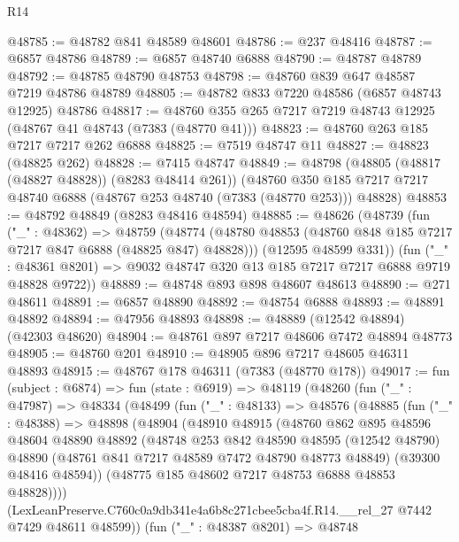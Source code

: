 \begin{lexlean}{R14}
\begin{coremodule}
@48785 := @48782 @841 @48589 @48601
@48786 := @237 @48416
@48787 := @6857 @48786
@48789 := @6857 @48740 @6888
@48790 := @48787 @48789
@48792 := @48785 @48790 @48753
@48798 := @48760 @839 @647 @48587 @7219 @48786 @48789
@48805 := @48782 @833 @7220 @48586 (@6857 @48743 @12925) @48786
@48817 := @48760 @355 @265 @7217 @7219 @48743 @12925 (@48767 @41 @48743 (@7383 (@48770 @41)))
@48823 := @48760 @263 @185 @7217 @7217 @262 @6888
@48825 := @7519 @48747 @11
@48827 := @48823 (@48825 @262)
@48828 := @7415 @48747
@48849 := @48798
    (@48805 (@48817 (@48827 @48828)) (@8283 @48414 @261))
    (@48760 @350 @185 @7217 @7217 @48740 @6888 (@48767 @253 @48740 (@7383 (@48770 @253))) @48828)
@48853 := @48792 @48849 (@8283 @48416 @48594)
@48885 := @48626
    (@48739
      (fun ("_" : @48362) =>
      @48759
        (@48774 (@48780 @48853 (@48760 @848 @185 @7217 @7217 @847 @6888 (@48825 @847) @48828)))
        (@12595 @48599 @331))
      (fun ("_" : @48361 @8201) => @9032 @48747 @320 @13 @185 @7217 @7217 @6888 @9719 @48828 @9722))
@48889 := @48748 @893 @898 @48607 @48613
@48890 := @271 @48611
@48891 := @6857 @48890
@48892 := @48754 @6888
@48893 := @48891 @48892
@48894 := @47956 @48893
@48898 := @48889 (@12542 @48894) (@42303 @48620)
@48904 := @48761 @897 @7217 @48606 @7472 @48894 @48773
@48905 := @48760 @201
@48910 := @48905 @896 @7217 @48605 @46311 @48893
@48915 := @48767 @178 @46311 (@7383 (@48770 @178))
@49017 := fun (subject : @6874) =>
  fun (state : @6919) =>
  @48119
    (@48260
      (fun ("_" : @47987) =>
      @48334
        (@48499
          (fun ("_" : @48133) =>
          @48576
            (@48885
              (fun ("_" : @48388) =>
              @48898
                (@48904
                  (@48910
                    @48915
                    (@48760
                      @862
                      @895
                      @48596
                      @48604
                      @48890
                      @48892
                      (@48748
                        @253
                        @842
                        @48590
                        @48595
                        (@12542 @48790)
                        @48890
                        (@48761 @841 @7217 @48589 @7472 @48790 @48773 @48849)
                        (@39300 @48416 @48594))
                      (@48775 @185 @48602 @7217 @48753 @6888 @48853 @48828))))
                (LexLeanPreserve.C760c0a9db341e4a6b8c271cbee5cba4f.R14.__rel_27
                  @7442
                  @7429
                  @48611
                  @48599))
              (fun ("_" : @48387 @8201) =>
              @48748

\end{coremodule}
\end{lexlean}

